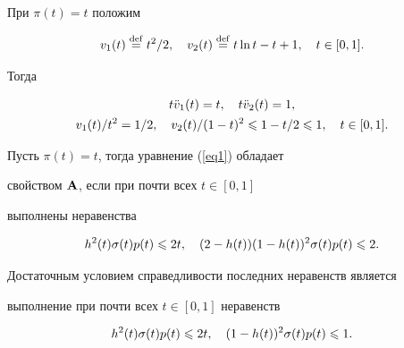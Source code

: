 При $\pi(t)=t$ положим


$$


v_1(t)\df t^2/2,\quad v_2(t)\df t\ln t-t+1,\quad t\in[0,1].


$$


Тогда


\begin{gather*}


t\Ddot v_1(t)=t,\q t\Ddot v_2(t)=1, \\


v_1(t)/t^2=1/2,\q v_2(t)/(1-t)^2\le1-t/2\le1,\q  t\in[0,1].


\end{gather*}





\begin{cor}


Пусть $\pi(t)=t$, тогда уравнение (\ref{eq1}) обладает


свойством $\bold A$, если при почти всех $t\in[0,1]$


выполнены неравенства


$$


{h^2(t)}\s(t)p(t)\le{2t},\q


{(2-h(t))(1-h(t))^2}\s(t)p(t)\le{2}.


$$





Достаточным условием справедливости последних неравенств является


выполнение при почти всех $t\in [0,1]$ неравенств


$$


{h^2(t)}\s(t)p(t)\le{2t},\q


{(1-h(t))^2}\s(t)p(t)\le{1}.


$$


\end{cor}





